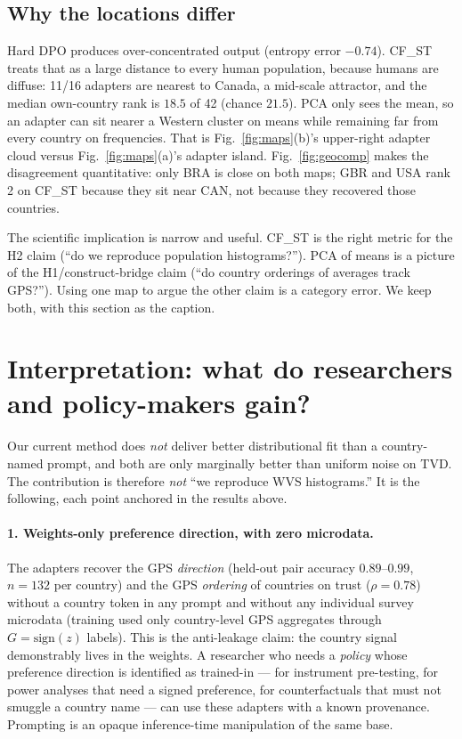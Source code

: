 \documentclass[11pt]{article}
\begin{document}
\subsection{Why the locations differ}
Hard DPO produces over-concentrated output (entropy error $-0.74$). CF\_ST treats that as a large distance to every human population, because humans are diffuse: 11/16 adapters are nearest to Canada, a mid-scale attractor, and the median own-country rank is $18.5$ of 42 (chance $21.5$). PCA only sees the mean, so an adapter can sit nearer a Western cluster on means while remaining far from every country on frequencies. That is Fig.~\ref{fig:maps}(b)'s upper-right adapter cloud versus Fig.~\ref{fig:maps}(a)'s adapter island. Fig.~\ref{fig:geocomp} makes the disagreement quantitative: only BRA is close on both maps; GBR and USA rank 2 on CF\_ST because they sit near CAN, not because they recovered those countries.

The scientific implication is narrow and useful. CF\_ST is the right metric for the H2 claim (``do we reproduce population histograms?''). PCA of means is a picture of the H1/construct-bridge claim (``do country orderings of averages track GPS?''). Using one map to argue the other claim is a category error. We keep both, with this section as the caption.

\section{Interpretation: what do researchers and policy-makers gain?}
\label{sec:gains}

Our current method does \emph{not} deliver better distributional fit than a country-named prompt, and both are only marginally better than uniform noise on TVD. The contribution is therefore \emph{not} ``we reproduce WVS histograms.'' It is the following, each point anchored in the results above.

\paragraph{1. Weights-only preference direction, with zero microdata.}
The adapters recover the GPS \emph{direction} (held-out pair accuracy $0.89$--$0.99$, $n=132$ per country) and the GPS \emph{ordering} of countries on trust ($\rho=0.78$) without a country token in any prompt and without any individual survey microdata (training used only country-level GPS aggregates through $G=\mathrm{sign}(z)$ labels). This is the anti-leakage claim: the country signal demonstrably lives in the weights. A researcher who needs a \emph{policy} whose preference direction is identified as trained-in --- for instrument pre-testing, for power analyses that need a signed preference, for counterfactuals that must not smuggle a country name --- can use these adapters with a known provenance. Prompting is an opaque inference-time manipulation of the same base.
\end{document}
